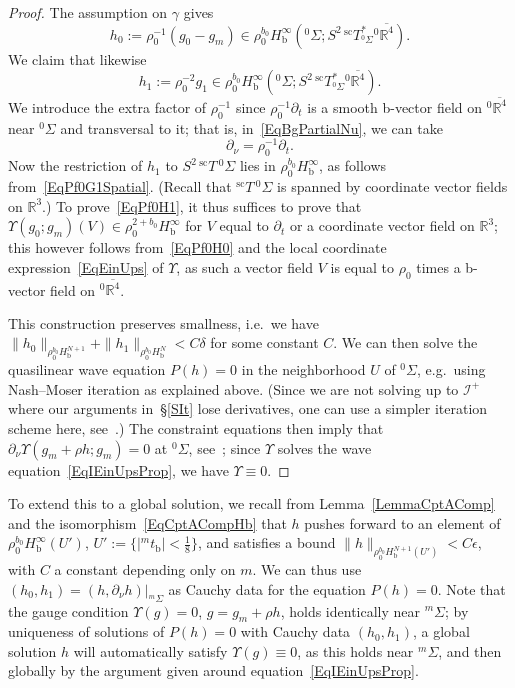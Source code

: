 \documentclass[reqno,11pt,letterpaper]{amsart}
\numberwithin{equation}{section}
\numberwithin{figure}{section}
\theoremstyle{definition}
\theoremstyle{remark}
\newcommand{\ms}{\mathscr}
\newcommand{\scri}{\ms I}
\newcommand{\R}{\mathbb{R}}
\newcommand{\Ups}{\Upsilon}
\newcommand{\eps}{\epsilon}
\newcommand{\ol}{\overline}
\newcommand{\pa}{\partial}
\newcommand{\bop}{{\mathrm{b}}}
\newcommand{\scl}{{\mathrm{sc}}}
\newcommand{\Tsc}{{}^{\scl}T}
\newcommand{\Hb}{H_{\bop}}
\begin{document}
\begin{proof}
  The assumption on $\gamma$ gives
  \begin{equation}
  \label{EqPf0H0}
    h_0:=\rho_0^{-1}(g_0-g_m)\in\rho_0^{b_0}\Hb^\infty({}^0\Sigma;S^2\,\Tsc^*_{{}^0\Sigma}{}^0\ol{\R^4}).
  \end{equation}
  We claim that likewise
  \begin{equation}
  \label{EqPf0H1}
    h_1:=\rho_0^{-2}g_1\in\rho_0^{b_0}\Hb^\infty({}^0\Sigma;S^2\,\Tsc^*_{{}^0\Sigma}{}^0\ol{\R^4}).
  \end{equation}
  We introduce the extra factor of $\rho_0^{-1}$ since $\rho_0^{-1}\pa_t$ is a smooth b-vector field on ${}^0\ol{\R^4}$ near ${}^0\Sigma$ and transversal to it; that is, in~\eqref{EqBgPartialNu}, we can take
  \[
    \pa_\nu=\rho_0^{-1}\pa_t.
  \]
  Now the restriction of $h_1$ to $S^2\,\Tsc\,{}^0\Sigma$ lies in $\rho_0^{b_0}\Hb^\infty$, as follows from~\eqref{EqPf0G1Spatial}. (Recall that $\Tsc\,{}^0\Sigma$ is spanned by coordinate vector fields on $\R^3$.) To prove~\eqref{EqPf0H1}, it thus suffices to prove that $\Ups(g_0;g_m)(V)\in\rho_0^{2+b_0}\Hb^\infty$ for $V$ equal to $\pa_t$ or a coordinate vector field on $\R^3$; this however follows from~\eqref{EqPf0H0} and the local coordinate expression~\eqref{EqEinUps} of $\Ups$, as such a vector field $V$ is equal to $\rho_0$ times a b-vector field on ${}^0\ol{\R^4}$.

  This construction preserves smallness, i.e.\ we have $\|h_0\|_{\rho_0^{b_0}\Hb^{N+1}}+\|h_1\|_{\rho_0^{b_0}\Hb^N}<C\delta$ for some constant $C$. We can then solve the quasilinear wave equation $P(h)=0$ in the neighborhood $U$ of ${}^0\Sigma$, e.g.\ using Nash--Moser iteration as explained above. (Since we are not solving up to $\scri^+$ where our arguments in~\S\ref{SIt} lose derivatives, one can use a simpler iteration scheme here, see~\cite[\S16.1]{TaylorPDE}.) The constraint equations then imply that $\pa_\nu\Ups(g_m+\rho h;g_m)=0$ at ${}^0\Sigma$, see~\cite[\S2.1]{HintzVasyKdSStability}; since $\Ups$ solves the wave equation~\eqref{EqIEinUpsProp}, we have $\Ups\equiv 0$.
\end{proof}

To extend this to a global solution, we recall from Lemma~\ref{LemmaCptAComp} and the isomorphism~\eqref{EqCptACompHb} that $h$ pushes forward to an element of $\rho_0^{b_0}\Hb^\infty(U')$, $U':=\{|{}^m t_\bop|<\tfrac18\}$, and satisfies a bound $\|h\|_{\rho_0^{b_0}\Hb^{N+1}(U')}<C\eps$, with $C$ a constant depending only on $m$. We can thus use $(h_0,h_1)=(h,\pa_\nu h)|_{{}^m\Sigma}$ as Cauchy data for the equation $P(h)=0$. Note that the gauge condition $\Ups(g)=0$, $g=g_m+\rho h$, holds identically near ${}^m\Sigma$; by uniqueness of solutions of $P(h)=0$ with Cauchy data $(h_0,h_1)$, a global solution $h$ will automatically satisfy $\Ups(g)\equiv 0$, as this holds near ${}^m\Sigma$, and then globally by the argument given around equation~\eqref{EqIEinUpsProp}.
\end{document}
